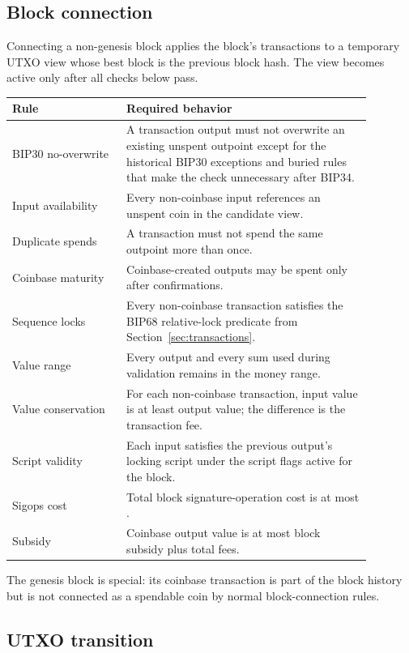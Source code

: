 \subsection{Block connection}

Connecting a non-genesis block applies the block's transactions to a temporary
UTXO view whose best block is the previous block hash. The view becomes active
only after all checks below pass.

\begin{longtable}{@{}L{0.28\linewidth}L{0.60\linewidth}@{}}
\toprule
Rule & Required behavior \\
\midrule
BIP30 no-overwrite & A transaction output must not overwrite an existing unspent outpoint except for the historical BIP30 exceptions and buried rules that make the check unnecessary after BIP34. \\
Input availability & Every non-coinbase input references an unspent coin in the candidate view. \\
Duplicate spends & A transaction must not spend the same outpoint more than once. \\
Coinbase maturity & Coinbase-created outputs may be spent only after  confirmations. \\
Sequence locks & Every non-coinbase transaction satisfies the BIP68 relative-lock predicate from Section~\ref{sec:transactions}. \\
Value range & Every output and every sum used during validation remains in the money range. \\
Value conservation & For each non-coinbase transaction, input value is at least output value; the difference is the transaction fee. \\
Script validity & Each input satisfies the previous output's locking script under the script flags active for the block. \\
Sigops cost & Total block signature-operation cost is at most . \\
Subsidy & Coinbase output value is at most block subsidy plus total fees. \\
\bottomrule
\end{longtable}

The genesis block is special: its coinbase transaction is part of the block
history but is not connected as a spendable coin by normal block-connection
rules.

\subsection{UTXO transition}

